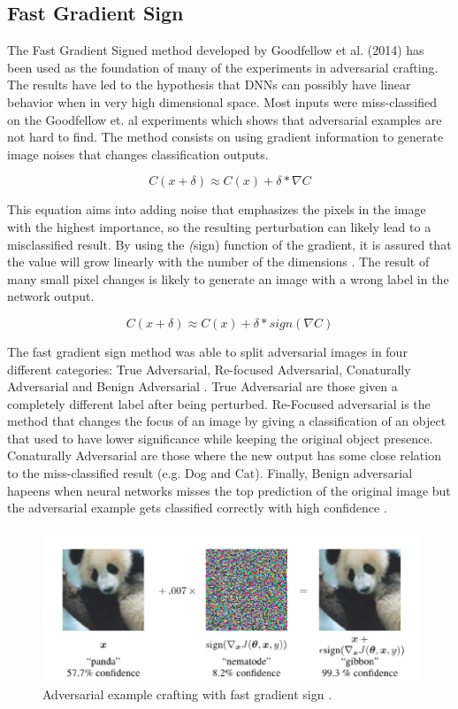 \documentclass{article}
\begin{document}
\subsection{Fast Gradient Sign}\label{subsec:fast_gradient}

The Fast Gradient Signed method developed by Goodfellow et al. (2014) has been used as the foundation of many of the experiments in adversarial crafting. The results have led to the hypothesis that DNNs can possibly have linear behavior when in very high dimensional space.  Most inputs were miss-classified on the Goodfellow et. al \cite{goodfellow2014} experiments which shows that adversarial examples are not hard to find. The method consists on using gradient information to generate image noises that changes classification outputs.

$$ C(x + \delta)\approx C(x) + \delta * \nabla C$$

This equation aims into adding noise that emphasizes the pixels in the image with the highest importance, so the resulting perturbation can likely lead to a misclassified result. By using the \textit(sign) function of the gradient, it is assured that the value will grow linearly with the number of the dimensions \cite{goodfellow2014}. The result of many small pixel changes is likely to generate an image with a wrong label in the network output.

$$ C(x + \delta)\approx C(x) + \delta * sign(\nabla C)$$

The fast gradient sign method was able to split adversarial images in four different categories: True Adversarial, Re-focused Adversarial, Conaturally Adversarial and Benign Adversarial \cite{billovits}. True Adversarial are those given a completely different label after being perturbed. Re-Focused adversarial is the method that changes the focus of an image by giving a classification of an object that used to have lower significance while keeping the original object presence. Conaturally Adversarial are those where the new output has some close relation to the miss-classified result (e.g. Dog and Cat). Finally, Benign adversarial hapeens when neural networks misses the top prediction of the original image but the adversarial example gets classified correctly with high confidence \cite{billovits}.

\begin{figure}[!h]
\centering
	\includegraphics[scale=0.6]{panda.png}
\caption{Adversarial example crafting with fast gradient sign \cite{goodfellow2014}.}
\label{fig:net_change}
\end{figure}
\end{document}
